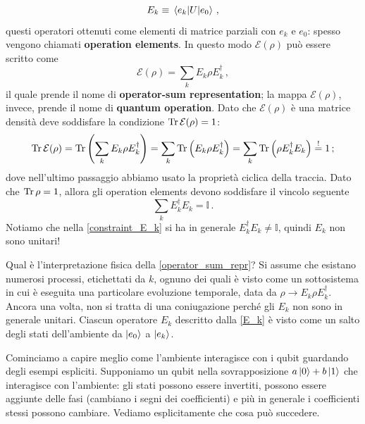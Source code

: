 \begin{equation}\label{E_k}
    E_k \equiv \mel{e_k}{U}{e_0} \, ,
\end{equation}
questi operatori ottenuti come elementi di matrice parziali con $e_k$ e $e_0$: spesso vengono chiamati \textbf{operation elements}. In questo modo $\mathcal{E}(\rho)$ può essere scritto come
\begin{equation}\label{operator_sum_repr}
    \mathcal{E}(\rho) = \sum_k E_k \rho E_k^\dag \, ,
\end{equation}
il quale prende il nome di \textbf{operator-sum representation}; la mappa $\mathcal{E}(\rho)$, invece, prende il nome di \textbf{quantum operation}. Dato che $\mathcal{E}(\rho)$ è una matrice densità deve soddisfare la condizione $\Tr \mathcal{E}(\rho) = 1$:
\begin{equation*}
    \Tr \mathcal{E}(\rho) = \Tr \left( \sum_k E_k \rho E_k^\dag \right) = \sum_k \Tr \left( E_k \rho E_k^\dag \right) = \sum_k \Tr \left( \rho E_k^\dag E_k \right) \overset{!}{=} 1 \, ;
\end{equation*}
dove nell'ultimo passaggio abbiamo usato la proprietà ciclica della traccia. Dato che $\Tr \rho = 1$, allora gli operation elements devono soddisfare il vincolo seguente
\begin{equation}\label{constraint_E_k}
    \sum_k E_k^\dag E_k = \mathbb{I} \, .
\end{equation}
Notiamo che nella \eqref{constraint_E_k} si ha in generale $E^\dag_k E_k \neq \mathbb{I}$, quindi $E_k$ non sono unitari! 

\noindent Qual è l'interpretazione fisica della \eqref{operator_sum_repr}? Si assume che esistano numerosi processi, etichettati da $k$, ognuno dei quali è visto come un sottosistema in cui è eseguita una particolare evoluzione temporale, data da $\rho \rightarrow E_k \rho E_k^\dag$. Ancora una volta, non si tratta di una coniugazione perché gli $E_k$ non sono in generale unitari. Ciascun operatore $E_k$ descritto dalla \eqref{E_k} è visto come un salto degli stati dell'ambiente da $\ket{e_0}$ a $\ket{e_k}$. 

\noindent Cominciamo a capire meglio come l'ambiente interagisce con i qubit guardando degli esempi espliciti. Supponiamo un qubit nella sovrapposizione $a\ket{0} + b\ket{1}$ che interagisce con l'ambiente: gli stati possono essere invertiti, possono essere aggiunte delle fasi (cambiano i segni dei coefficienti) e più in generale i coefficienti stessi possono cambiare. Vediamo esplicitamente che cosa può succedere. 

